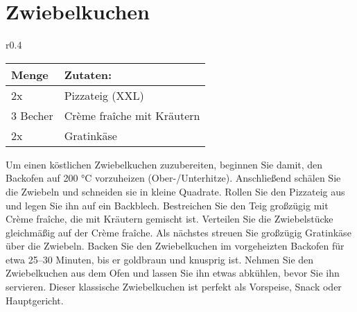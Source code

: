 \section{Zwiebelkuchen}
\begin{wraptable}{r}{0.4\textwidth}
  \centering
  \begin{tabularx}{0.39\textwidth}{|l|X|}
    \toprule
    Menge & Zutaten: \\
    \midrule
    2x & Pizzateig (XXL) \\
    \midrule
    3 Becher & Crème fraîche mit Kräutern \\
    \midrule
    2x & Gratinkäse\\
    \bottomrule
  \end{tabularx}
\end{wraptable}
Um einen köstlichen Zwiebelkuchen zuzubereiten, beginnen Sie damit, den Backofen auf 200 °C vorzuheizen (Ober-/Unterhitze).
Anschließend schälen Sie die Zwiebeln und schneiden sie in kleine Quadrate.
Rollen Sie den Pizzateig aus und legen Sie ihn auf ein Backblech.
Bestreichen Sie den Teig großzügig mit Crème fraîche, die mit Kräutern gemischt ist.
Verteilen Sie die Zwiebelstücke gleichmäßig auf der Crème fraîche.
Als nächstes streuen Sie großzügig Gratinkäse über die Zwiebeln.
Backen Sie den Zwiebelkuchen im vorgeheizten Backofen für etwa 25–30 Minuten, bis er goldbraun und knusprig ist.
Nehmen Sie den Zwiebelkuchen aus dem Ofen und lassen Sie ihn etwas abkühlen, bevor Sie ihn servieren.
Dieser klassische Zwiebelkuchen ist perfekt als Vorspeise, Snack oder Hauptgericht.
\newpage
